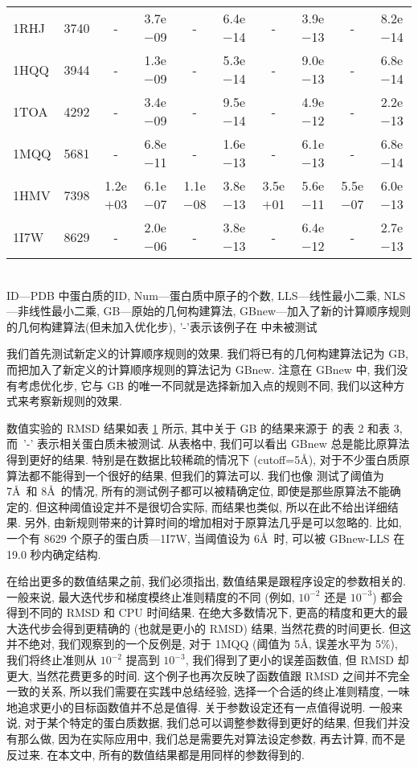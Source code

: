 \begin{table}[!htbp]
{\begin{tabular}{lrcccccccc}
      1RHJ & 3740 &     -     & 3.7e$-$09 &     -     & 6.4e$-$14 &     -     & 3.9e$-$13 &     -    & 8.2e$-$14  \\
      1HQQ & 3944 &     -     & 1.3e$-$09 &     -     & 5.3e$-$14 &     -     & 9.0e$-$13 &     -    & 6.8e$-$14  \\
      1TOA & 4292 &     -     & 3.4e$-$09 &     -     & 9.5e$-$14 &     -     & 4.9e$-$12 &     -    & 2.2e$-$13  \\
      1MQQ & 5681 &     -     & 6.8e$-$11 &     -     & 1.6e$-$13 &     -     & 6.1e$-$13 &     -    & 6.8e$-$14  \\
      1HMV & 7398 & 1.2e$+$03 & 6.1e$-$07 & 1.1e$-$08 & 3.8e$-$13 & 3.5e$+$01 & 5.6e$-$11 & 5.5e$-$07& 6.0e$-$13  \\
      1I7W & 8629 &     -     & 2.0e$-$06 &     -     & 3.8e$-$13 &     -     & 6.4e$-$12 &     -    & 2.7e$-$13  \\ \toprule
    \end{tabular}\\[-4mm]
    \label{table:exact}
    \bl *ID---PDB 中蛋白质的ID, Num---蛋白质中原子的个数, LLS---线性最小二乘, NLS---非线性最小二乘, GB---原始的几何构建算法, GBnew---加入了新的计算顺序规则的几何构建算法(但未加入优化步), '-'表示该例子在 \cite{Sit2009} 中未被测试 \el
  }
\end{table}

我们首先测试新定义的计算顺序规则的效果.
我们将已有的几何构建算法记为 GB, 
而把加入了新定义的计算顺序规则的算法记为 GBnew.
注意在 GBnew 中, 我们没有考虑优化步,
它与 GB 的唯一不同就是选择新加入点的规则不同, 
我们以这种方式来考察新规则的效果.

数值实验的 RMSD 结果如表 \ref{table:exact} 所示, 
其中关于 GB 的结果来源于 \cite{Sit2009} 的表 2 和表 3, 
而~'-' 表示相关蛋白质未被测试. 
从表格中, 我们可以看出 GBnew 总是能比原算法得到更好的结果.
特别是在数据比较稀疏的情况下 (cutoff=5\AA), 
对于不少蛋白质原算法都不能得到一个很好的结果,
但我们的算法可以.
我们也像 \cite{Sit2009} 测试了阈值为 7\AA ~和 8\AA~的情况, 
所有的测试例子都可以被精确定位, 即使是那些原算法不能确定的.
但这种阈值设定并不是很切合实际, 而结果也类似, 所以在此不给出详细结果.
另外, 由新规则带来的计算时间的增加相对于原算法几乎是可以忽略的.
比如, 一个有 8629 个原子的蛋白质---1I7W, 当阈值设为 6\AA ~时,
可以被 GBnew-LLS 在 19.0 秒内确定结构.

在给出更多的数值结果之前, 我们必须指出,
数值结果是跟程序设定的参数相关的.
一般来说, 最大迭代步和梯度模终止准则精度的不同 (例如, $10^{-2}$ 还是 $10^{-3}$) 
都会得到不同的 RMSD 和 CPU 时间结果. 
在绝大多数情况下, 更高的精度和更大的最大迭代步会得到更精确的 (也就是更小的 RMSD)
结果, 当然花费的时间更长.
但这并不绝对, 我们观察到的一个反例是,
对于 1MQQ (阈值为 5\AA, 误差水平为 5\%), 
我们将终止准则从 $10^{-2}$ 提高到 $10^{-3}$, 
我们得到了更小的误差函数值, 但 RMSD 却更大, 当然花费更多的时间.
这个例子也再次反映了函数值跟 RMSD 之间并不完全一致的关系,
所以我们需要在实践中总结经验, 选择一个合适的终止准则精度, 
一味地追求更小的目标函数值并不总是值得.
关于参数设定还有一点值得说明.
一般来说, 对于某个特定的蛋白质数据, 我们总可以调整参数得到更好的结果,
但我们并没有那么做, 因为在实际应用中, 
我们总是需要先对算法设定参数, 再去计算, 而不是反过来.
在本文中, 所有的数值结果都是用同样的参数得到的.

